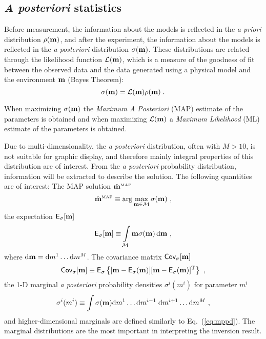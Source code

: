 \documentclass{saclantc}
\newcommand{\MAP}[1]{\hat{#1}^{\mbox{\tiny\rm MAP}}}
\newcommand{\E}{{\sf E}}
\begin{document}
\subsection{{\it A posteriori} statistics}
\label{se:post}

Before  measurement, the information about the models is reflected
in the {\it a priori} distribution $ \rho({\bf m})$, and after the experiment,
the information about the models is reflected in the {\it a posteriori}
distribution $\sigma({\bf m})$.  These distributions are related
through the likelihood function ${\cal L}({\bf m})$, which is a measure of the
goodness of fit between the observed data and the data generated using
a physical model and the environment $\bf m$ (Bayes Theorem):
\begin{equation} 
   \sigma({\bf m}) ={\cal L}({\bf m}) \rho({\bf m}) \; .  \label{eq:bayes} 
\end{equation} 

When maximizing  $  \sigma({\bf m}) $  the {\it Maximum A Posteriori} (MAP)
estimate of the parameters is obtained and when maximizing  
${\cal L}({\bf m})$  a {\it Maximum Likelihood} (ML) estimate of the
parameters is obtained.

Due to  multi-dimensionality, the {\it a posteriori} distribution, 
often with $ M > 10$, is not suitable for graphic display, 
and therefore mainly integral properties of this distribution are of interest.
From the {\it a posteriori\/} probability distribution, 
 information will be extracted to describe the solution. 
The following quantities are of interest:
The MAP solution $\MAP{\bf m}$
\begin{equation}
 \MAP{\bf m}  \equiv \arg\max\limits_{{\bf m} \in {\cal M}} \sigma ({\bf m} )~,
 \label{eq:map}
\end{equation}
the expectation $\E_\sigma[{\bf m}]$
\begin{equation}
 \E_\sigma [{\bf m}] \equiv\int\limits_{\cal M} {\bf m} \sigma ({\bf m})\, 
 {\rm d} {\bf m}~, 
 \label{eq:mean}
\end{equation}
where ${\rm d}{\bf m}  = {\rm d} m^1 \ldots {\rm d}m^M$.
The covariance matrix $\mbox{\sf Cov}_\sigma[{\bf m}]$
\begin{equation}
 {\sf Cov}_\sigma [{\bf m}] \equiv  \E_\sigma
 \left\{  [{\bf m} - \mbox\E_\sigma ({\bf m})] 
          [{\bf m} - \mbox\E_\sigma ({\bf m})]^{\rm T} 
 \right\}~,
 \label{eq:cov}
\end{equation}
the 1-D marginal {\it a posteriori} probability densities  $ \sigma^i (m^i)$ 
for parameter $m^i$
\begin{equation}
   \sigma^i (m^i) \equiv \int\sigma({\bf m})
  {\rm d}{m^1}     \ldots {\rm d}{m^{i-1}} \; 
  {\rm d}{m^{i+1}} \ldots {\rm d}{m^{M}}~,
\label{eq:mppd}
\end{equation}
and higher-dimensional marginals are defined similarly to
 Eq.~(\ref{eq:mppd}).
The marginal distributions are the most important in interpreting the
inversion result.
\end{document}
